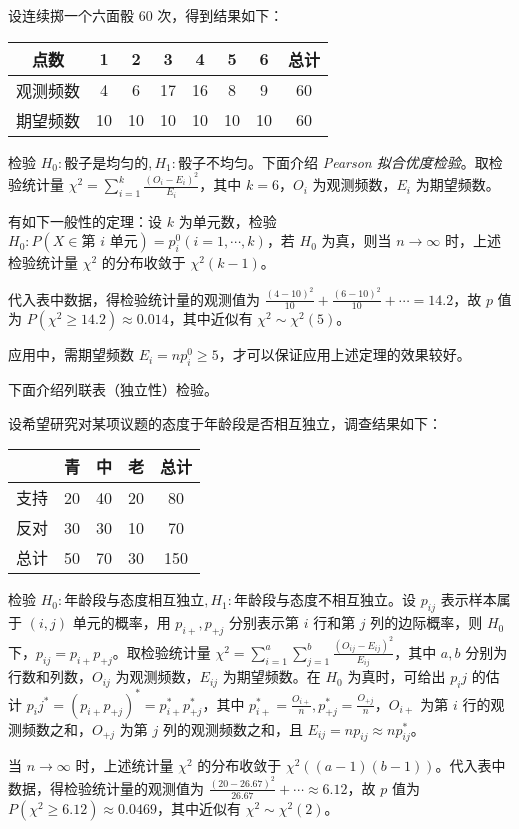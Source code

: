 \documentclass[../main.tex]{subfiles}
\begin{document}
\begin{example}
    设连续掷一个六面骰 $60$ 次，得到结果如下：

    \bigskip
    \begin{tabular}{|c|c|c|c|c|c|c|c|}
        \hline
        点数     & 1  & 2  & 3  & 4  & 5  & 6  & 总计 \\
        \hline
        观测频数 & 4  & 6  & 17 & 16 & 8  & 9  & 60   \\
        \hline
        期望频数 & 10 & 10 & 10 & 10 & 10 & 10 & 60   \\
        \hline
    \end{tabular}
    \bigskip

    检验 $H_0:\text{骰子是均匀的},H_1:\text{骰子不均匀}$。下面介绍 \emph{Pearson 拟合优度检验}。取检验统计量 $\chi^2=\sum_{i=1}^k\frac{(O_i-E_i)^2}{E_i}$，其中 $k=6$，$O_i$ 为观测频数，$E_i$ 为期望频数。

    有如下一般性的定理：设 $k$ 为单元数，检验 $H_0:P(X\in\text{第 $i$ 单元})=p_i^0(i=1,\cdots,k)$，若 $H_0$ 为真，则当 $n\rightarrow\infty$ 时，上述检验统计量 $\chi^2$ 的分布收敛于 $\chi^2(k-1)$。

    代入表中数据，得检验统计量的观测值为 $\frac{(4-10)^2}{10}+\frac{(6-10)^2}{10}+\cdots=14.2$，故 $p$ 值为 $P(\chi^2\geq14.2)\approx0.014$，其中近似有 $\chi^2\sim\chi^2(5)$。
\end{example}

应用中，需期望频数 $E_i=np_i^0\geq 5$，才可以保证应用上述定理的效果较好。

下面介绍列联表（独立性）检验。

\begin{example}
    设希望研究对某项议题的态度于年龄段是否相互独立，调查结果如下：

    \bigskip
    \begin{tabular}{|c|c|c|c|c|}
        \hline
             & 青 & 中 & 老 & 总计 \\
        \hline
        支持 & 20 & 40 & 20 & 80   \\
        \hline
        反对 & 30 & 30 & 10 & 70   \\
        \hline
        总计 & 50 & 70 & 30 & 150  \\
        \hline
    \end{tabular}
    \bigskip

    检验 $H_0:\text{年龄段与态度相互独立},H_1:\text{年龄段与态度不相互独立}$。设 $p_{ij}$ 表示样本属于 $(i,j)$ 单元的概率，用 $p_{i+},p_{+j}$ 分别表示第 $i$ 行和第 $j$ 列的边际概率，则 $H_0$ 下，$p_{ij}=p_{i+}p_{+j}$。取检验统计量 $\chi^2=\sum_{i=1}^a\sum_{j=1}^b\frac{(O_{ij}-E_{ij})^2}{E_{ij}}$，其中 $a,b$ 分别为行数和列数，$O_{ij}$ 为观测频数，$E_{ij}$ 为期望频数。在 $H_0$ 为真时，可给出 $p_ij$ 的估计 $p_ij^*=(p_{i+}p_{+j})^*=p_{i+}^*p_{+j}^*$，其中 $p_{i+}^*=\frac{O_{i+}}n,p_{+j}^*=\frac{O_{+j}}n$，$O_{i+}$ 为第 $i$ 行的观测频数之和，$O_{+j}$ 为第 $j$ 列的观测频数之和，且 $E_{ij}=np_{ij}\approx np_{ij}^*$。

    当 $n\rightarrow\infty$ 时，上述统计量 $\chi^2$ 的分布收敛于 $\chi^2((a-1)(b-1))$。代入表中数据，得检验统计量的观测值为 $\frac{(20-26.67)^2}{26.67}+\cdots\approx6.12$，故 $p$ 值为 $P(\chi^2\geq6.12)\approx0.0469$，其中近似有 $\chi^2\sim\chi^2(2)$。
\end{example}
\end{document}
